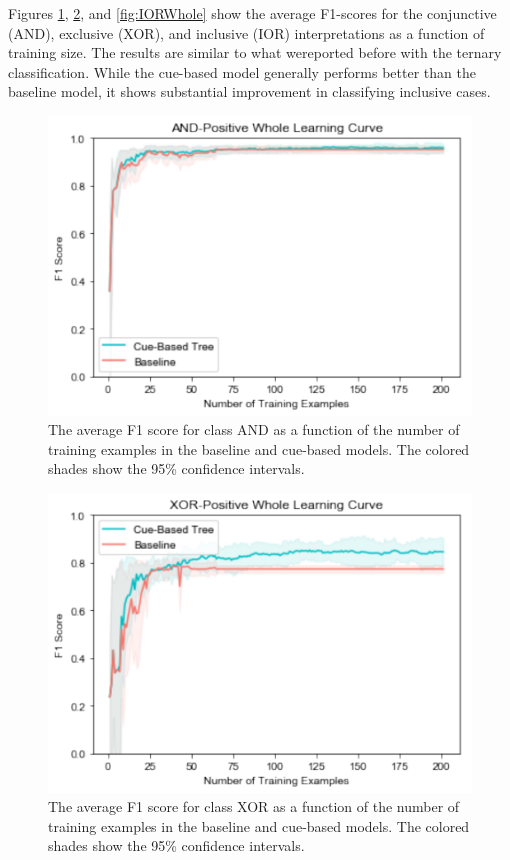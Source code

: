 \documentclass[,man,floatsintext]{apa6}
\begin{document}
Figures \ref{fig:ANDWhole}, \ref{fig:XORWhole}, and \ref{fig:IORWhole} show the average F1-scores for the conjunctive (AND), exclusive (XOR), and inclusive (IOR) interpretations as a function of training size. The results are similar to what wereported before with the ternary classification. While the cue-based model generally performs better than the baseline model, it shows substantial improvement in classifying inclusive cases.

\begin{figure}
\centering
\includegraphics{figs/ANDWhole-1.pdf}
\caption{\label{fig:ANDWhole}The average F1 score for class AND as a function of the number of training examples in the baseline and cue-based models. The colored shades show the 95\% confidence intervals.}
\end{figure}

\begin{figure}
\centering
\includegraphics{figs/XORWhole-1.pdf}
\caption{\label{fig:XORWhole}The average F1 score for class XOR as a function of the number of training examples in the baseline and cue-based models. The colored shades show the 95\% confidence intervals.}
\end{figure}
\end{document}
